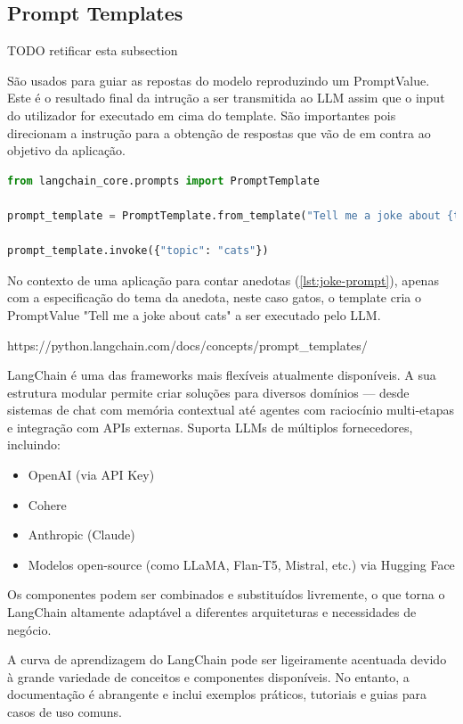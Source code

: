 \subsection{Prompt Templates} TODO retificar esta subsection

São usados para guiar as repostas do modelo reproduzindo um PromptValue. Este é o resultado final da intrução a ser transmitida ao LLM assim que o input do utilizador for executado em cima do template. São importantes pois direcionam a instrução para a obtenção de respostas que vão de em contra ao objetivo da aplicação. 


\begin{lstlisting}[language=Python, caption={Using LangChain to create a prompt template}, label={lst:joke-prompt}]
from langchain_core.prompts import PromptTemplate

prompt_template = PromptTemplate.from_template("Tell me a joke about {topic}")

prompt_template.invoke({"topic": "cats"})
\end{lstlisting}

No contexto de uma aplicação para contar anedotas (\ref{lst:joke-prompt}), apenas com a especificação do tema da anedota, neste caso gatos, o template cria o PromptValue "Tell me a joke about cats"  a ser executado pelo LLM.


https://python.langchain.com/docs/concepts/prompt\_templates/


LangChain é uma das frameworks mais flexíveis atualmente disponíveis. A sua estrutura modular permite criar soluções para diversos domínios — desde sistemas de chat com memória contextual até agentes com raciocínio multi-etapas e integração com APIs externas. Suporta LLMs de múltiplos fornecedores, incluindo:

\begin{itemize} \item OpenAI (via API Key) \item Cohere \item Anthropic (Claude) \item Modelos open-source (como LLaMA, Flan-T5, Mistral, etc.) via Hugging Face \end{itemize}

Os componentes podem ser combinados e substituídos livremente, o que torna o LangChain altamente adaptável a diferentes arquiteturas e necessidades de negócio.



A curva de aprendizagem do LangChain pode ser ligeiramente acentuada devido à grande variedade de conceitos e componentes disponíveis. No entanto, a documentação é abrangente e inclui exemplos práticos, tutoriais e guias para casos de uso comuns.

